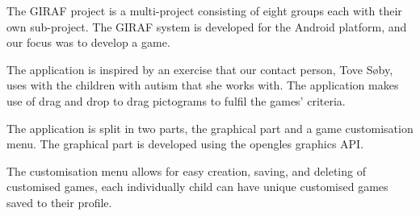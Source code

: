 The GIRAF project is a multi-project consisting of eight groups each with their own sub-project. The GIRAF system is developed for the Android platform, and our focus was to develop a game. 

The application is inspired by an exercise that our contact person, Tove Søby, uses with the children with autism that she works with. The application makes use of drag and drop to drag pictograms to fulfil the games' criteria. 

The application is split in two parts, the graphical part and a game customisation menu. The graphical part is developed using the \ac{opengles} graphics API. 

The customisation menu allows for easy creation, saving, and deleting of customised games, each individually child can have unique customised games saved to their profile. 
